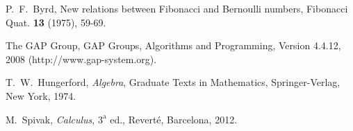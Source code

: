 \begin{thebibliography}{9999}


P.~F.~Byrd, New relations between Fibonacci and Bernoulli numbers, Fibonacci Quat. \textbf{13} (1975), 59-69.

The GAP Group, GAP Groups, Algorithms and Programming, Version 4.4.12, 2008 (http://www.gap-system.org).

 T.~W.~Hungerford, \textsl{Algebra}, Graduate Texts in Mathematics, Springer-Verlag, New York, 1974.

M.~Spivak, \textsl{Calculus}, $3^{\text{a}}$ ed.,
Revert\'e, Barcelona, 2012.


\end{thebibliography} 